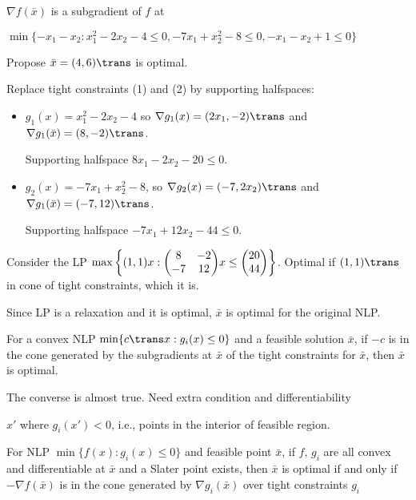 \begin{lemma}
  $\nabla f(\bar x)$ is a subgradient of $f$ at
\end{lemma}

\begin{example}
  $\min\{-x_1 - x_2 : x_1^2 - 2x_2 - 4 \leq 0, -7x_1 + x_2^2 - 8 \leq 0, -x_1 - x_2 + 1 \leq 0\}$
\end{example}
\begin{sol}
  Propose $\bar x = (4,6)\trans$ is optimal.

  Replace tight constraints (1) and (2) by supporting halfspaces:
  \begin{itemize}
    \item $g_1(x) = x_1^2 - 2x_2 - 4$ so
          $\nabla g_1(x) = (2x_1, -2)\trans$ and
          $\nabla g_1(\bar x) = (8,-2)\trans$. 
          
          Supporting halfspace $8x_1 - 2x_2 - 20 \leq 0$.
    \item $g_2(x) = -7x_1 + x_2^2 - 8$, so
          $\nabla g_2(x) = (-7, 2x_2)\trans$ and
          $\nabla g_1(\bar x) = (-7, 12)\trans$.
          
          Supporting halfspace $-7x_1 + 12x_2 - 44 \leq 0$.
  \end{itemize}

  Consider the LP
  $\max\qty{(1,1)x : \mqty(8&-2\\-7&12)x\leq\mqty(20\\44)}$.
  Optimal if $(1,1)\trans$ in cone of tight constraints, which it is.
  
  Since LP is a relaxation and it is optimal,
  $\bar x$ is optimal for the original NLP.
\end{sol}

\begin{prop}
  For a convex NLP $\min\{c\trans x : g_i(x) \leq 0\}$ and
  a feasible solution $\bar x$, if $-c$ is in the cone generated by
  the subgradients at $\bar x$ of the tight constraints for
  $\bar x$, then $\bar x$ is optimal.
\end{prop}

The converse is almost true. Need extra condition and differentiability

\begin{defn}
  $x'$ where $g_i(x') < 0$, i.e., points in the interior of feasible region.
\end{defn}

\begin{theorem}
  For NLP $\min\{f(x) : g_i(x) \leq 0\}$ and feasible point $\bar x$,
  if $f$, $g_i$ are all convex and differentiable at $\bar x$
  and a Slater point exists,
  then $\bar x$ is optimal if and only if
  $-\nabla f(\bar x)$ is in the cone generated by
  $\nabla g_i(\bar x)$ over tight constraints $g_i$
\end{theorem}
